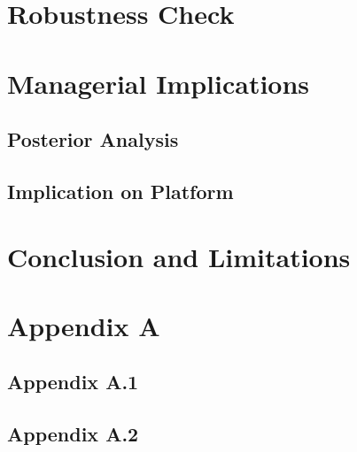 \documentclass[a4paper, 12pt]{article}
\begin{document}
\section{Robustness Check}
\section{Managerial Implications}
\subsection{Posterior Analysis}
\subsection{Implication on Platform}
\section{Conclusion and Limitations}

\clearpage



\clearpage
\section*{Appendix A}
\subsection*{Appendix A.1}
\subsection*{Appendix A.2}
\end{document}
